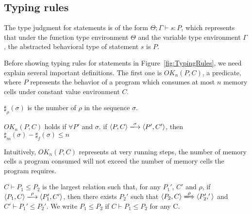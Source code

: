 \subsection{Typing rules}
The type judgment for statements is of the form \(\Theta; \Gamma
\vdash s : P \), which represents that under the function type
environment \(\Theta\) and the variable type environment \(\Gamma\),
the abstracted behavioral type of statement \(s\) is \(P\).

Before showing typing rules for statements in
Figure~\ref{fig:TypingRules}, we need explain several important
definitions. The first one is \(OK_n(P, C)\), a predicate, where \(P\)
represents the behavior of a program which consumes at most \(n\)
memory cells under constant value environment \(C\).

\begin{myDef}[\(\sharp_{\rho}(\sigma)\)]
\label{df:sharf}
\(\sharp_{\rho}(\sigma)\) is the number of \(\rho\) in the sequence
\(\sigma\).
\end{myDef}



\begin{myDef}
\label{df:okn}
\(OK_{n}(P, C)\) holds if \( \forall P'\) and \(\sigma\). if \( \langle P, C \rangle
\xlongrightarrow{\sigma} \langle P', C' \rangle \), then \( \sharp_m(\sigma) - \sharp_f(\sigma) \le n\)
\end{myDef}



Intuitively, \(OK_n(P, C)\) represents at very running steps, the
number of memory cells a program consumed will not exceed the number
of memory cells the program requires.

\begin{myDef}[Subtyping]
\( C\vdash P_1 \le P_2\) is the largest relation such that, for any
\(P_1'\), \(C'\) and \(\rho\), if \( \langle P_1, C \rangle
\xlongrightarrow{\rho} \langle P_1', C' \rangle \), then there exists
\(P_2'\) such that \( \langle P_2, C \rangle \xLongrightarrow{\rho}
\langle P_2', ' \rangle \) and \( C'\vdash P_1' \le P_2'\).  We write
\( P_1 \le P_2\) if \(C\vdash P_1 \le P_2\) for any C.
\label{df:subtype}
\end{myDef}

